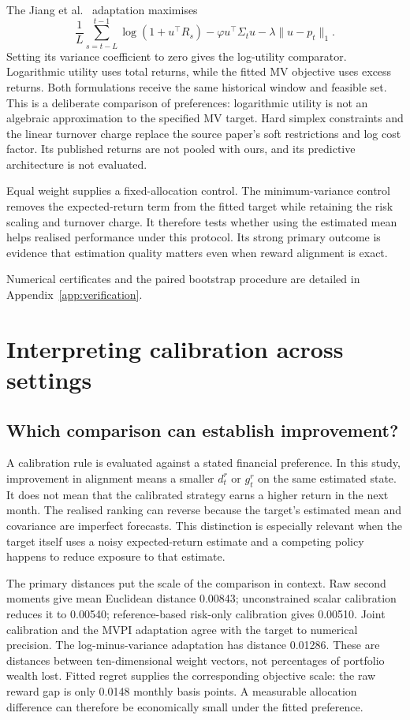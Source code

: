 \documentclass[sigconf,anonymous,review]{acmart}
\begin{document}
The Jiang et al.\ \cite{jiang2025} adaptation maximises
\begin{equation}
 \frac1L\sum_{s=t-L}^{t-1}\log(1+u^\top R_s)
 -\varphi u^\top\Sigma_tu-\lambda\|u-p_t\|_1.
\end{equation}
Setting its variance coefficient to zero gives the log-utility comparator. Logarithmic utility uses total returns, while the fitted MV objective uses excess returns. Both formulations receive the same historical window and feasible set. This is a deliberate comparison of preferences: logarithmic utility is not an algebraic approximation to the specified MV target. Hard simplex constraints and the linear turnover charge replace the source paper's soft restrictions and log cost factor. Its published returns are not pooled with ours, and its predictive architecture is not evaluated.

Equal weight supplies a fixed-allocation control. The minimum-variance control removes the expected-return term from the fitted target while retaining the risk scaling and turnover charge. It therefore tests whether using the estimated mean helps realised performance under this protocol. Its strong primary outcome is evidence that estimation quality matters even when reward alignment is exact.

Numerical certificates and the paired bootstrap procedure are detailed in Appendix~\ref{app:verification}.

\section{Interpreting calibration across settings}
\subsection{Which comparison can establish improvement?}
A calibration rule is evaluated against a stated financial preference. In this study, improvement in alignment means a smaller $d_t^r$ or $g_t^r$ on the same estimated state. It does not mean that the calibrated strategy earns a higher return in the next month. The realised ranking can reverse because the target's estimated mean and covariance are imperfect forecasts. This distinction is especially relevant when the target itself uses a noisy expected-return estimate and a competing policy happens to reduce exposure to that estimate.

The primary distances put the scale of the comparison in context. Raw second moments give mean Euclidean distance 0.00843; unconstrained scalar calibration reduces it to 0.00540; reference-based risk-only calibration gives 0.00510. Joint calibration and the MVPI adaptation agree with the target to numerical precision. The log-minus-variance adaptation has distance 0.01286. These are distances between ten-dimensional weight vectors, not percentages of portfolio wealth lost. Fitted regret supplies the corresponding objective scale: the raw reward gap is only 0.0148 monthly basis points. A measurable allocation difference can therefore be economically small under the fitted preference.
\end{document}
